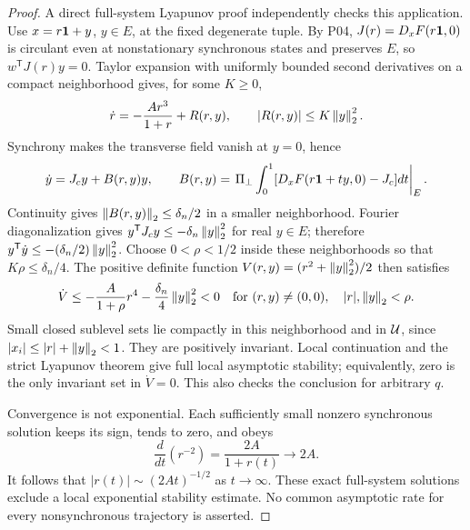 \begin{proof}
A direct full-system Lyapunov proof independently checks this application.
Use $x=r\mathbf{1}+y$, $y\in E$, at the fixed degenerate tuple.
By P04, $J(r)=D_xF(r\mathbf{1},0)$ is circulant even at nonstationary
synchronous states and preserves $E$, so $w^{\mathsf T}J(r)y=0$.
Taylor expansion with uniformly bounded second derivatives on a compact
neighborhood gives, for some $K\ge0$,
\begin{equation}
 \dot r=-\frac{Ar^3}{1+r}+R(r,y),\qquad |R(r,y)|\le K\left\lVert y\right\rVert_2^2.
 \label{eq:P09-average-remainder}
\end{equation}
Synchrony makes the transverse field vanish at $y=0$, hence
\[
 \dot y=J_cy+B(r,y)y,\qquad
 B(r,y)=\left.\Pi_\perp\int_0^1
 [D_xF(r\mathbf{1}+t y,0)-J_c]dt\right|_E.
\]
Continuity gives $\left\lVert B(r,y)\right\rVert_2\le\delta_n/2$ in a smaller
neighborhood. Fourier diagonalization gives
$y^{\mathsf T}J_cy\le-\delta_n\left\lVert y\right\rVert_2^2$ for real $y\in E$;
therefore $y^{\mathsf T}\dot y\le-(\delta_n/2)\left\lVert y\right\rVert_2^2$.
Choose $0<\rho<1/2$ inside these neighborhoods so that
$K\rho\le\delta_n/4$. The positive definite function
$V(r,y)=(r^2+\left\lVert y\right\rVert_2^2)/2$ then satisfies
\begin{equation}
 \dot V\le-\frac{A}{1+\rho}r^4-\frac{\delta_n}{4}\left\lVert y\right\rVert_2^2<0
 \quad\hbox{for }(r,y)\ne(0,0),\quad |r|,\left\lVert y\right\rVert_2<\rho.
 \label{eq:P09-lyapunov}
\end{equation}
Small closed sublevel sets lie compactly in this neighborhood and in
$\mathcal{U}$, since $|x_i|\le|r|+\left\lVert y\right\rVert_2<1$. They are positively
invariant. Local continuation and the strict Lyapunov theorem give
full local asymptotic stability; equivalently, zero is the only invariant
set in $\dot V=0$. This also checks the conclusion for arbitrary $q$.

Convergence is not exponential. Each sufficiently small nonzero
synchronous solution keeps its sign, tends to zero, and obeys
\[
 \frac{d}{dt}(r^{-2})=\frac{2A}{1+r(t)}\longrightarrow2A.
\]
It follows that $|r(t)|\sim(2At)^{-1/2}$ as $t\to\infty$.
These exact full-system solutions exclude a local exponential stability
estimate. No common asymptotic rate for every nonsynchronous trajectory
is asserted.
\end{proof}

